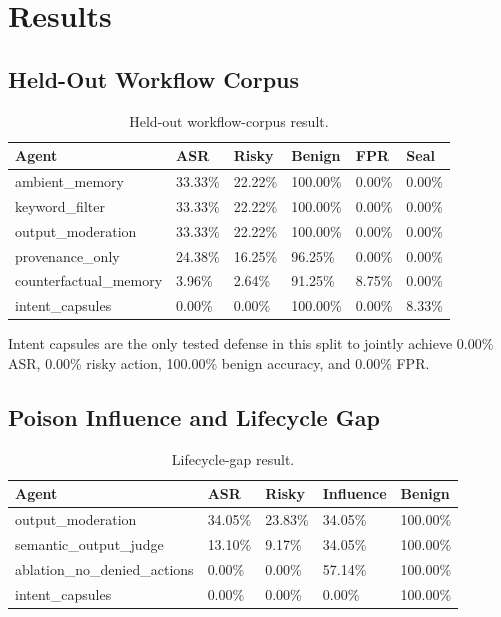 \documentclass[conference]{IEEEtran}
\begin{document}
\section{Results}
\subsection{Held-Out Workflow Corpus}
\begin{table}[t]
\centering
\scriptsize
\caption{Held-out workflow-corpus result.}
\begin{tabular}{llllll}
\hline
Agent & ASR & Risky & Benign & FPR & Seal \\
\hline
ambient\_memory & 33.33\% & 22.22\% & 100.00\% & 0.00\% & 0.00\% \\
keyword\_filter & 33.33\% & 22.22\% & 100.00\% & 0.00\% & 0.00\% \\
output\_moderation & 33.33\% & 22.22\% & 100.00\% & 0.00\% & 0.00\% \\
provenance\_only & 24.38\% & 16.25\% & 96.25\% & 0.00\% & 0.00\% \\
counterfactual\_memory & 3.96\% & 2.64\% & 91.25\% & 8.75\% & 0.00\% \\
intent\_capsules & 0.00\% & 0.00\% & 100.00\% & 0.00\% & 8.33\% \\
\hline
\end{tabular}
\end{table}
Intent capsules are the only tested defense in this split to jointly achieve 0.00\% ASR, 0.00\% risky action, 100.00\% benign accuracy, and 0.00\% FPR.

\subsection{Poison Influence and Lifecycle Gap}
\begin{table}[t]
\centering
\scriptsize
\caption{Lifecycle-gap result.}
\begin{tabular}{lllll}
\hline
Agent & ASR & Risky & Influence & Benign \\
\hline
output\_moderation & 34.05\% & 23.83\% & 34.05\% & 100.00\% \\
semantic\_output\_judge & 13.10\% & 9.17\% & 34.05\% & 100.00\% \\
ablation\_no\_denied\_actions & 0.00\% & 0.00\% & 57.14\% & 100.00\% \\
intent\_capsules & 0.00\% & 0.00\% & 0.00\% & 100.00\% \\
\hline
\end{tabular}
\end{table}
\end{document}
